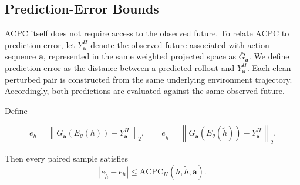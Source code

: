 

\subsection{Prediction-Error Bounds}

ACPC itself does not require access to the observed future. To relate ACPC to
prediction error, let $Y_{\mathbf a}^H$ denote the observed future associated
with action sequence $\mathbf a$, represented in the same weighted projected
space as $\bar G_{\mathbf a}$. We define prediction error as the distance between a
predicted rollout and $Y_{\mathbf a}^H$. Each clean--perturbed pair is
constructed from the same underlying environment trajectory. Accordingly, both
predictions are evaluated against the same observed future.

\begin{proposition}
\label{prop:target-free-error-drift}
Define

$$
e_h =
\left\|\bar G_{\mathbf a}(E_\theta(h))-Y_{\mathbf a}^H\right\|_2,
\qquad
e_{\tilde h} =
\left\|\bar G_{\mathbf a}(E_\theta(\tilde h))-Y_{\mathbf a}^H\right\|_2.
$$

Then every paired sample satisfies
\begin{equation}
|e_{\tilde h}-e_h|
\le
\mathrm{ACPC}_H(h,\tilde h,\mathbf a).
\label{eq:target-free-error-drift}
\end{equation}
\end{proposition}

